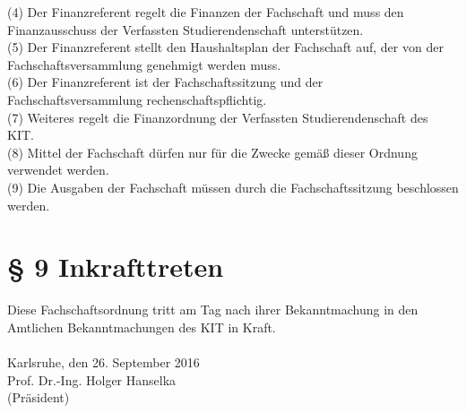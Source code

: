 \documentclass[a4paper, parskip=half, numbers=noenddot]{scrartcl}
\begin{document}
(4) Der Finanzreferent regelt die Finanzen der Fachschaft und muss den Finanzausschuss der Verfassten Studierendenschaft unterstützen.\\

(5) Der Finanzreferent stellt den Haushaltsplan der Fachschaft auf, der von der Fachschaftsversammlung genehmigt werden muss.\\

(6) Der Finanzreferent ist der Fachschaftssitzung und der Fachschaftsversammlung rechenschaftspflichtig.\\

(7) Weiteres regelt die Finanzordnung der Verfassten Studierendenschaft des KIT.\\

(8) Mittel der Fachschaft dürfen nur für die Zwecke gemäß dieser Ordnung verwendet werden.\\

(9) Die Ausgaben der Fachschaft müssen durch die Fachschaftssitzung beschlossen werden.


%
%


\section*{§ 9 Inkrafttreten}

Diese Fachschaftsordnung tritt am Tag nach ihrer Bekanntmachung in den Amtlichen Bekanntmachungen des KIT in Kraft.\\\\
Karlsruhe, den 26. September 2016\\
Prof. Dr.-Ing. Holger Hanselka\\
(Präsident)
\end{document}

